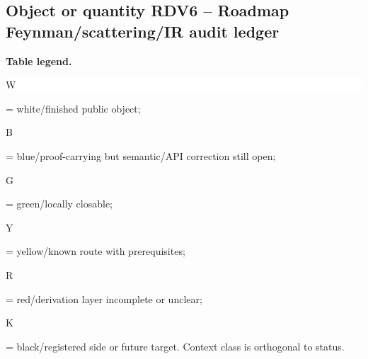 \subsection*{Object or quantity RDV6 -- Roadmap Feynman/\allowbreak{}scattering/\allowbreak{}IR audit ledger}
\hypertarget{objproof:RDV6}{}
\par\smallskip\noindent\begin{minipage}{0.99\linewidth}\footnotesize\raggedright\textbf{Table legend.} \colorbox{white}{\strut W} = white/finished public object; \colorbox{cyan!20}{\strut B} = blue/proof-carrying but semantic/API correction still open; \colorbox{green!18}{\strut G} = green/locally closable; \colorbox{yellow!25}{\strut Y} = yellow/known route with prerequisites; \colorbox{red!20}{\strut R} = red/derivation layer incomplete or unclear; \colorbox{black!18}{\strut K} = black/registered side or future target. Context class is orthogonal to status.\end{minipage}\par\vspace{0.25em}
